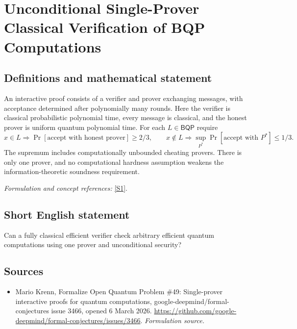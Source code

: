\documentclass[11pt]{article}
\begin{document}
\section*{\texorpdfstring{Unconditional Single-Prover Classical Verification of BQP Computations}{Unconditional Single-Prover Classical Verification of BQP Computations}}\label{129}
\subsection{Definitions and mathematical statement}
An interactive proof consists of a verifier and prover exchanging messages, with acceptance determined after polynomially many rounds. Here the verifier is classical probabilistic polynomial time, every message is classical, and the honest prover is uniform quantum polynomial time. For each $L\in\mathsf{BQP}$ require
\[
 x\in L\Rightarrow\Pr[\text{accept with honest prover}]\ge2/3,\qquad
 x\notin L\Rightarrow\sup_{P^*}\Pr[\text{accept with }P^*]\le1/3.
\]
The supremum includes computationally unbounded cheating provers. There is only one prover, and no computational hardness assumption weakens the information-theoretic soundness requirement.
\par\smallskip\textit{Formulation and concept references:} \href{https://github.com/google-deepmind/formal-conjectures/issues/3466}{[S1]}.

\subsection{Short English statement}
Can a fully classical efficient verifier check arbitrary efficient quantum computations using one prover and unconditional security?
\subsection{Sources}
\begin{itemize}
\item[S1]Mario Krenn, Formalize Open Quantum Problem \#49: Single-prover interactive proofs for quantum computations, google-deepmind/formal-conjectures issue 3466, opened 6 March 2026.
\url{https://github.com/google-deepmind/formal-conjectures/issues/3466}.
\textit{Formulation source.}
\end{itemize}
\end{document}
